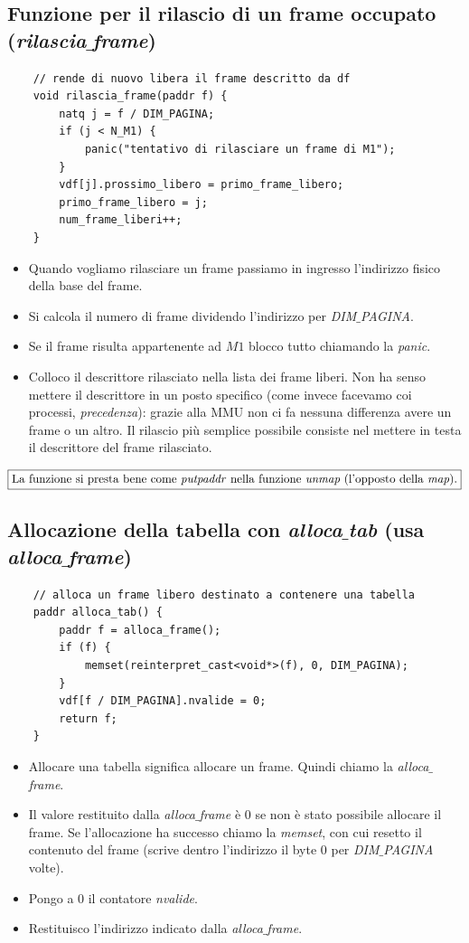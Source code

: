 \subsection{Funzione per il rilascio di un frame occupato (\emph{rilascia$\_$frame})}
\small 
\begin{verbatim}
	// rende di nuovo libera il frame descritto da df
	void rilascia_frame(paddr f) {
		natq j = f / DIM_PAGINA;
		if (j < N_M1) {
			panic("tentativo di rilasciare un frame di M1");
		}
		vdf[j].prossimo_libero = primo_frame_libero;
		primo_frame_libero = j;
		num_frame_liberi++;
	}
\end{verbatim}
\normalsize 
\begin{itemize}
	\item Quando vogliamo rilasciare un frame passiamo in ingresso l'indirizzo fisico della base del frame.
	\item Si calcola il numero di frame dividendo l'indirizzo per \emph{DIM$\_$PAGINA}. 
	\item Se il frame risulta appartenente ad $M1$ blocco tutto chiamando la \emph{panic}.
	\item Colloco il descrittore rilasciato nella lista dei frame liberi. Non ha senso mettere il descrittore in un posto specifico (come invece facevamo coi processi, \emph{precedenza}): grazie alla MMU non ci fa nessuna differenza avere un frame o un altro. Il rilascio più semplice possibile consiste nel mettere in testa il descrittore del frame rilasciato.
\end{itemize}
\[\boxed{\text{La funzione si presta bene come \emph{putpaddr} nella funzione \emph{unmap} (l'opposto della \emph{map}).}}\]
\subsection{Allocazione della tabella con \emph{alloca$\_$tab} (usa \emph{alloca$\_$frame})}
\small 
\begin{verbatim}
	// alloca un frame libero destinato a contenere una tabella
	paddr alloca_tab() {
		paddr f = alloca_frame();
		if (f) {
			memset(reinterpret_cast<void*>(f), 0, DIM_PAGINA);
		}
		vdf[f / DIM_PAGINA].nvalide = 0;
		return f;
	}
\end{verbatim}
\normalsize 
\begin{itemize}
	\item Allocare una tabella significa allocare un frame. Quindi chiamo la \emph{alloca$\_$frame}.
	\item Il valore restituito dalla \emph{alloca$\_$frame} è $0$ se non è stato possibile allocare il frame. Se l'allocazione ha successo chiamo la \emph{memset}, con cui resetto il contenuto del frame (scrive dentro l'indirizzo il byte $0$ per \emph{DIM$\_$PAGINA} volte).
	\item Pongo a $0$ il contatore \emph{nvalide}.
	\item Restituisco l'indirizzo indicato dalla \emph{alloca$\_$frame}.
\end{itemize} 
